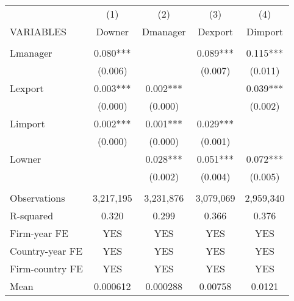 \begin{tabular}{lcccc} \hline
 & (1) & (2) & (3) & (4) \\
VARIABLES & Downer & Dmanager & Dexport & Dimport \\ \hline
 &  &  &  &  \\
Lmanager & 0.080*** &  & 0.089*** & 0.115*** \\
 & (0.006) &  & (0.007) & (0.011) \\
Lexport & 0.003*** & 0.002*** &  & 0.039*** \\
 & (0.000) & (0.000) &  & (0.002) \\
Limport & 0.002*** & 0.001*** & 0.029*** &  \\
 & (0.000) & (0.000) & (0.001) &  \\
Lowner &  & 0.028*** & 0.051*** & 0.072*** \\
 &  & (0.002) & (0.004) & (0.005) \\
 &  &  &  &  \\
Observations & 3,217,195 & 3,231,876 & 3,079,069 & 2,959,340 \\
R-squared & 0.320 & 0.299 & 0.366 & 0.376 \\
Firm-year FE & YES & YES & YES & YES \\
Country-year FE & YES & YES & YES & YES \\
Firm-country FE & YES & YES & YES & YES \\
 Mean & 0.000612 & 0.000288 & 0.00758 & 0.0121 \\ \hline
\end{tabular}
